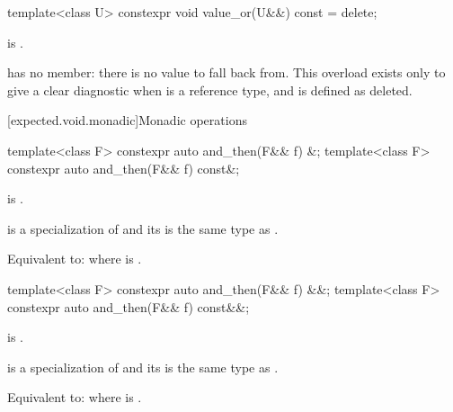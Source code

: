 %
\begin{itemdecl}
template<class U>
  constexpr void value_or(U&&) const = delete;
\end{itemdecl}

\begin{itemdescr}
\pnum
\constraints
{} is .

\pnum
\remarks
{} has no  member: there is no value to fall back from. This overload exists only to give a clear diagnostic when  is a reference type, and is defined as deleted.
\end{itemdescr}

[expected.void.monadic]{Monadic operations}

%
\begin{itemdecl}
template<class F>
  constexpr auto and_then(F&& f) &;
template<class F>
  constexpr auto and_then(F&& f) const&;
\end{itemdecl}

\begin{itemdescr}
\pnum
\constraints
{} is .

\pnum
\mandates
{} is a specialization of  and its  is the same type as .

\pnum
\effects
Equivalent to:  where  is .
\end{itemdescr}

%
\begin{itemdecl}
template<class F>
  constexpr auto and_then(F&& f) &&;
template<class F>
  constexpr auto and_then(F&& f) const&&;
\end{itemdecl}

\begin{itemdescr}
\pnum
\constraints
{} is .

\pnum
\mandates
{} is a specialization of  and its  is the same type as .

\pnum
\effects
Equivalent to:  where  is .
\end{itemdescr}

